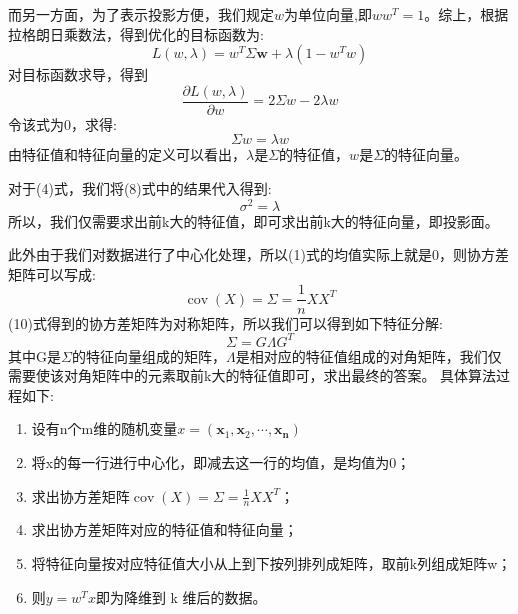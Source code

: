 \documentclass[lang=cn,a4paper,cite=authoryear]{elegantpaper}
\begin{document}
而另一方面，为了表示投影方便，我们规定$w$为单位向量,即$ww^T=1$。综上，根据拉格朗日乘数法，得到优化的目标函数为:
\begin{equation}
	L(w, \lambda)=w^{T} \Sigma \mathbf{w}+\lambda\left(1-w^{T} w\right)
\end{equation}
对目标函数求导，得到
\begin{equation}
	\frac{\partial L(w, \lambda)}{\partial w}=2 \Sigma w-2 \lambda w
\end{equation}
令该式为0，求得:
\begin{equation}
	\Sigma w=\lambda w
\end{equation}
由特征值和特征向量的定义可以看出，$\lambda$是$\Sigma$的特征值，$w$是$\Sigma$的特征向量。
\par 对于(4)式，我们将(8)式中的结果代入得到:
\begin{equation}
	\sigma^{2} =\lambda
\end{equation}
所以，我们仅需要求出前k大的特征值，即可求出前k大的特征向量，即投影面。
\par 此外由于我们对数据进行了中心化处理，所以(1)式的均值实际上就是0，则协方差矩阵可以写成:
\begin{equation}
	\operatorname{cov}(X)=\Sigma=\frac{1}{n} X X^{T}
\end{equation}
(10)式得到的协方差矩阵为对称矩阵，所以我们可以得到如下特征分解:
\begin{equation}
	\Sigma=G \Lambda G^{T}
\end{equation}
其中G是$\Sigma$的特征向量组成的矩阵，$ \Lambda$是相对应的特征值组成的对角矩阵，我们仅需要使该对角矩阵中的元素取前k大的特征值即可，求出最终的答案。
具体算法过程如下:
\begin{enumerate}[(1)]
\item 设有n个m维的随机变量$x=\left( \boldsymbol{x}_1,\boldsymbol{x}_2,\cdots ,\boldsymbol{x}_{\boldsymbol{n}} \right)$
\item 将x的每一行进行中心化，即减去这一行的均值，是均值为0；
\item 求出协方差矩阵$\operatorname{cov}(X)=\Sigma=\frac{1}{n} X X^{T}$；
\item 求出协方差矩阵对应的特征值和特征向量；
\item 将特征向量按对应特征值大小从上到下按列排列成矩阵，取前k列组成矩阵w；
\item 则$y=w^{T}x$即为降维到 k 维后的数据。
\end{enumerate}
\end{document}
